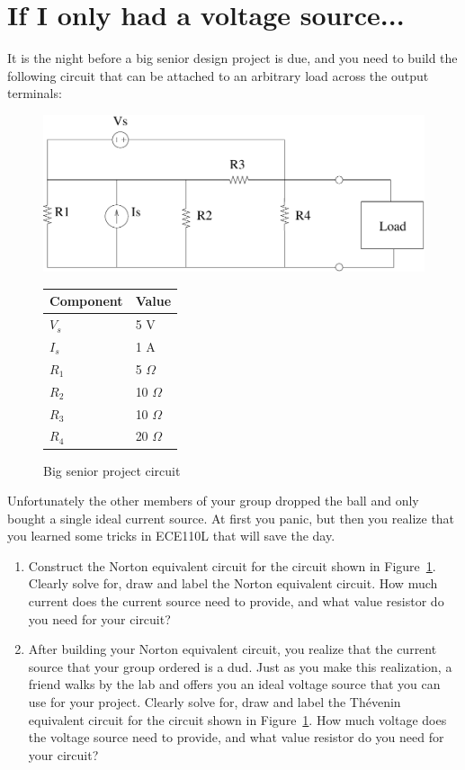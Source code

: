 \section{If I only had a voltage source...}
It is the night before a big senior design project is due, and you need to
build the following circuit that can be attached to an arbitrary load across
the output terminals:

\begin{figure}[h!]
\begin{minipage}[l]{0.75\linewidth}
\centering
\includegraphics[width=0.7\linewidth]{p3/p3} 
\caption{Big senior project circuit}
\label{fig:p3}
\end{minipage}\hfill
\begin{minipage}[l]{0.25\linewidth}
\begin{tabular}{|l|l|}
\hline
Component & Value \\ \hline
$V_s$ & 5 V \\ \hline
$I_s$ & 1 A \\ \hline
$R_1$ & 5 $\Omega$ \\ \hline
$R_2$ & 10 $\Omega$ \\ \hline
$R_3$ & 10 $\Omega$ \\ \hline
$R_4$ & 20 $\Omega$ \\ \hline
\end{tabular}
\end{minipage}
\end{figure}

Unfortunately the other members of your group dropped the ball and only bought
a single ideal current source.  At first you panic, but then you realize that
you learned some tricks in ECE110L that will save the day.  

\begin{enumerate}
    \item Construct the Norton equivalent circuit for the circuit shown in
        Figure~\ref{fig:p3}.  Clearly solve for, draw and label the Norton
        equivalent circuit.  How much current does the current source need to
        provide, and what value resistor do you need for your circuit?

    \item After building your Norton equivalent circuit, you realize that the
        current source that your group ordered is a dud.  Just as you make this
        realization, a friend walks by the lab and offers you an ideal voltage
        source that you can use for your project.  Clearly solve for, draw and
        label the Th\'{e}venin equivalent circuit for the circuit shown in
        Figure~\ref{fig:p3}.  How much voltage does the voltage source need to
        provide, and what value resistor do you need for your circuit?
\end{enumerate}
